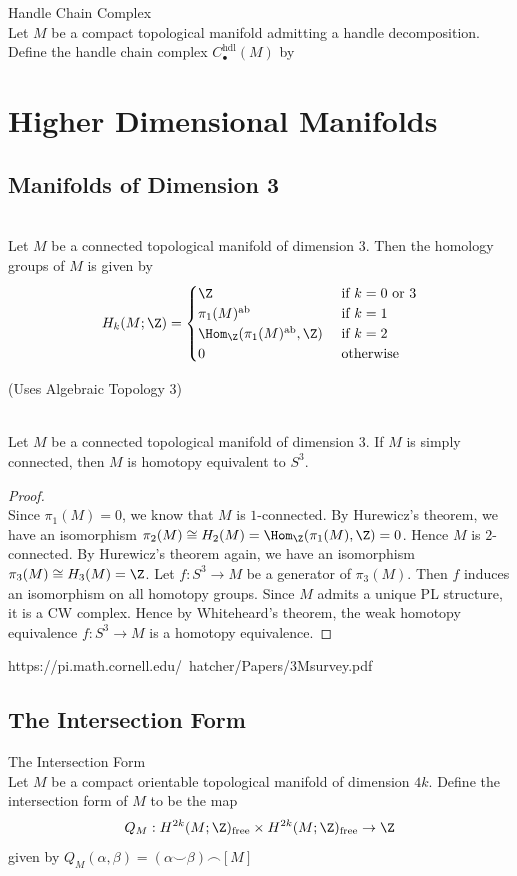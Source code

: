 \documentclass[a4paper]{article}
\begin{document}
\begin{defn}{Handle Chain Complex}{}\\
Let $M$ be a compact topological manifold admitting a handle decomposition. Define the handle chain complex $C_\bullet^\text{hdl}(M)$ by 
\end{defn}

\pagebreak
\section{Higher Dimensional Manifolds}
\subsection{Manifolds of Dimension 3}
\begin{prp}{}{}\\
Let $M$ be a connected topological manifold of dimension $3$. Then the homology groups of $M$ is given by $$H_k(M;\Z)=\begin{cases}
\Z & \text{ if } k=0\text{ or }3\\
\pi_1(M)^\text{ab} & \text{ if }k=1\\
\Hom_\Z(\pi_1(M)^\text{ab},\Z) & \text{ if }k=2\\
0 & \text{ otherwise }
\end{cases}$$
\end{prp}

(Uses Algebraic Topology 3)

\begin{prp}{}{}\\
Let $M$ be a connected topological manifold of dimension $3$. If $M$ is simply connected, then $M$ is homotopy equivalent to $S^3$. 
\begin{proof}\\
Since $\pi_1(M)=0$, we know that $M$ is $1$-connected. By Hurewicz's theorem, we have an isomorphism $\pi_2(M)\cong H_2(M)=\Hom_\Z(\pi_1(M),\Z)=0$. Hence $M$ is $2$-connected. By Hurewicz's theorem again, we have an isomorphism $\pi_3(M)\cong H_3(M)=\Z$. Let $f:S^3\to M$ be a generator of $\pi_3(M)$. Then $f$ induces an isomorphism on all homotopy groups. Since $M$ admits a unique PL structure, it is a CW complex. Hence by Whiteheard's theorem, the weak homotopy equivalence $f:S^3\to M$ is a homotopy equivalence. 
\end{proof}
\end{prp}

https://pi.math.cornell.edu/~hatcher/Papers/3Msurvey.pdf

\subsection{The Intersection Form}
\begin{defn}{The Intersection Form}{}\\
Let $M$ be a compact orientable topological manifold of dimension $4k$. Define the intersection form of $M$ to be the map $$Q_M:H^{2k}(M;\Z)_\text{free}\times H^{2k}(M;\Z)_\text{free}\to\Z$$ given by $Q_M(\alpha,\beta)=(\alpha\smile\beta)\frown[M]$
\end{defn}
\end{document}
